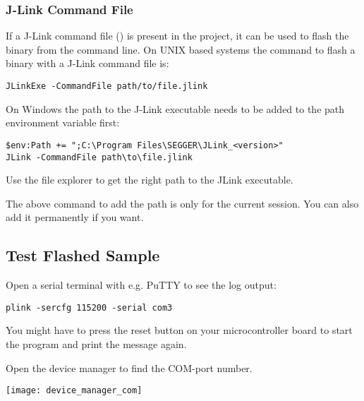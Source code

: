 \newpage

\subsubsection{J-Link Command File}
If a J-Link command file () is present in the project, it can be used to flash the binary from the command line.
On UNIX based systems the command to flash a binary with a J-Link command file is:

\begin{lstlisting}
JLinkExe -CommandFile path/to/file.jlink
\end{lstlisting}

On Windows the path to the J-Link executable needs to be added to the path environment variable first:

\begin{lstlisting}
$env:Path += ";C:\Program Files\SEGGER\JLink_<version>"
JLink -CommandFile path\to\file.jlink
\end{lstlisting}

\begin{infobox}
  Use the file explorer to get the right path to the JLink executable.
\end{infobox}

\begin{infobox}
  The above command to add the path is only for the current session.
  You can also add it permanently if you want.
\end{infobox}

\subsection{Test Flashed Sample}

Open a serial terminal with e.g. PuTTY to see the log output:

\begin{lstlisting}
plink -sercfg 115200 -serial com3
\end{lstlisting}

You might have to press the reset button on your microcontroller board to start the program and print the message again.

\begin{infobox}
  Open the device manager to find the COM-port number.
  \begin{center}
    \texttt{[image: device\_manager\_com]}
  \end{center}
\end{infobox}

